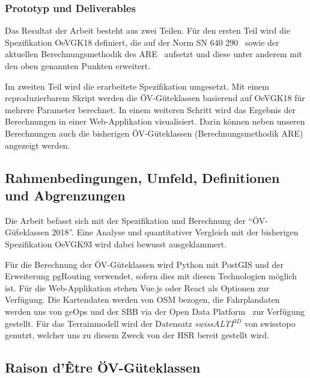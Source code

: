 \subsubsection{Prototyp und Deliverables}
\label{Ziele und Unterziele:Prototyp und Deliverables}

Das Resultat der Arbeit besteht aus zwei Teilen.
Für den ersten Teil wird die Spezifikation \gls{OeVGK18} definiert, die auf der Norm SN 640 290~\cite{sn640290} sowie der aktuellen Berechnungsmethodik des \acs{ARE}~\cite{berechnung_are} aufsetzt und diese unter anderem mit den oben genannten Punkten erweitert.

Im zweiten Teil wird die erarbeitete Spezifikation umgesetzt.
Mit einem reproduzierbarem Skript werden die \acs{ÖV}-Güteklassen basierend auf \gls{OeVGK18} für mehrere Parameter berechnet.
In einem weiteren Schritt wird das Ergebnis der Berechnungen in einer Web-Applikation visualisiert.
Darin können neben unseren Berechnungen auch die bisherigen \acs{ÖV}-Güteklassen (Berechnungsmethodik \acs{ARE}) angezeigt werden.

\subsection{Rahmenbedingungen, Umfeld, Definitionen und Abgrenzungen}
\label{Einführung:Rahmenbedingungen, Umfeld, Definitionen, Abgrenzungen}

Die Arbeit befasst sich mit der Spezifikation und Berechnung der "`ÖV-Güẗeklassen 2018"'.
Eine Analyse und quantitativer Vergleich mit der bisherigen Spezifikation \gls{OeVGK93} wird dabei bewusst ausgeklammert.

Für die Berechnung der ÖV-Güteklassen wird Python mit PostGIS und der Erweiterung pgRouting verwendet, sofern dies mit diesen Technologien möglich ist.
Für die Web-Applikation stehen Vue.js oder React als Optionen zur Verfügung. Die Kartendaten werden von \ac{OSM} bezogen, die Fahrplandaten werden uns von geOps und der SBB via der Open Data Platform~\cite{sbb_open_transport_data} zur Verfügung gestellt.
Für das \gls{Terrainmodell} wird der Datensatz \emph{swissALTI$^{3D}$} von swisstopo~\cite{swissalti3d_swisstopo} genutzt, welcher uns zu diesem Zweck von der HSR bereit gestellt wird.

\subsection{Raison d'Être ÖV-Güteklassen}
\label{Rahmenbedingungen, Umfeld, Definitionen, Abgrenzungen:Raison d’Être ÖV-Güteklassen}

